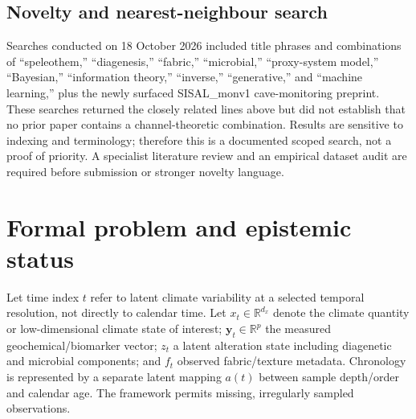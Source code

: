 \documentclass[11pt,a4paper]{article}
\begin{document}
\subsection{Novelty and nearest-neighbour search}
Searches conducted on 18 October 2026 included title phrases and combinations of “speleothem,” “diagenesis,” “fabric,” “microbial,” “proxy-system model,” “Bayesian,” “information theory,” “inverse,” “generative,” and “machine learning,” plus the newly surfaced SISAL\_monv1 cave-monitoring preprint. These searches returned the closely related lines above but did not establish that no prior paper contains a channel-theoretic combination. Results are sensitive to indexing and terminology; therefore this is a documented scoped search, not a proof of priority. A specialist literature review and an empirical dataset audit are required before submission or stronger novelty language.

\section{Formal problem and epistemic status}
Let time index $t$ refer to latent climate variability at a selected temporal resolution, not directly to calendar time. Let $x_t\in\mathbb{R}^{d_x}$ denote the climate quantity or low-dimensional climate state of interest; $\mathbf y_t\in\mathbb{R}^{p}$ the measured geochemical/biomarker vector; $z_t$ a latent alteration state including diagenetic and microbial components; and $f_t$ observed fabric/texture metadata. Chronology is represented by a separate latent mapping $a(t)$ between sample depth/order and calendar age. The framework permits missing, irregularly sampled observations.
\end{document}
